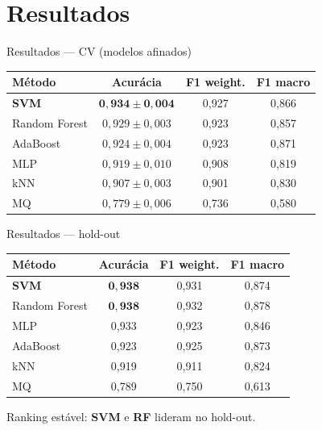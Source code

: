 \documentclass[aspectratio=169,11pt]{beamer}
\begin{document}
\section{Resultados}

\begin{frame}{Resultados --- CV (modelos afinados)}
  \begin{table}
    \centering
    \scriptsize
    \begin{tabular}{lccc}
      \toprule
      Método & Acurácia & F1 weight. & F1 macro \\
      \midrule
      \textbf{SVM} & $\mathbf{0{,}934\pm0{,}004}$ & 0{,}927 & 0{,}866 \\
      Random Forest & $0{,}929\pm0{,}003$ & 0{,}923 & 0{,}857 \\
      AdaBoost & $0{,}924\pm0{,}004$ & 0{,}923 & 0{,}871 \\
      MLP & $0{,}919\pm0{,}010$ & 0{,}908 & 0{,}819 \\
      kNN & $0{,}907\pm0{,}003$ & 0{,}901 & 0{,}830 \\
      MQ & $0{,}779\pm0{,}006$ & 0{,}736 & 0{,}580 \\
      \bottomrule
    \end{tabular}
  \end{table}
\end{frame}

\begin{frame}{Resultados --- hold-out}
  \begin{table}
    \centering
    \scriptsize
    \begin{tabular}{lccc}
      \toprule
      Método & Acurácia & F1 weight. & F1 macro \\
      \midrule
      \textbf{SVM} & $\mathbf{0{,}938}$ & 0{,}931 & 0{,}874 \\
      Random Forest & $\mathbf{0{,}938}$ & 0{,}932 & 0{,}878 \\
      MLP & 0{,}933 & 0{,}923 & 0{,}846 \\
      AdaBoost & 0{,}923 & 0{,}925 & 0{,}873 \\
      kNN & 0{,}919 & 0{,}911 & 0{,}824 \\
      MQ & 0{,}789 & 0{,}750 & 0{,}613 \\
      \bottomrule
    \end{tabular}
  \end{table}
  \vspace{0.4em}
  Ranking estável: \textbf{SVM} e \textbf{RF} lideram no hold-out.
\end{frame}
\end{document}

